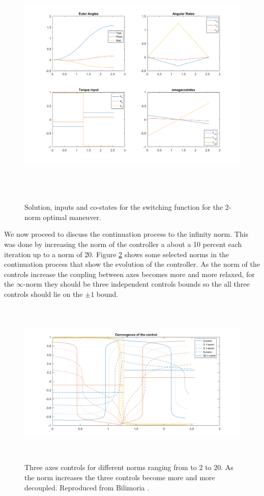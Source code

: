 \begin{figure}[H]
	\centering
	\includegraphics[height=12cm,keepaspectratio]{media/l2Maneuver.png}
	\caption{Solution, inputs and co-states for the switching function for the 2-norm optimal maneuver.}
	\label{fig:l2Maneuver}
\end{figure}

We now proceed to discuss the continuation process to the infinity norm. This was done by increasing the norm of the controller a about a 10 percent each iteration up to a norm of 20. Figure \ref{fig:lConvergence} shows some selected norms in the continuation process that show the evolution of the controller. As the norm of the controls increase the coupling between axes becomes more and more relaxed, for the $\infty$-norm they should be three independent controls bounds so the all three controls should lie on the $\pm1$ bound.

\begin{figure}[h]
	\centering
	\includegraphics[height=8cm,keepaspectratio]{media/controlConvergence.png}
	\caption{Three axes controls for different norms ranging from to 2 to 20. As the norm increases the three controls become more and more decoupled. Reproduced from Bilimoria \cite{bilimoria1993time}.}
	\label{fig:lConvergence}
\end{figure}

